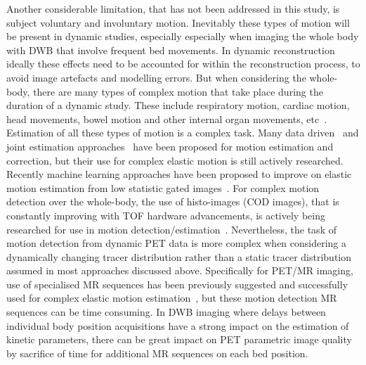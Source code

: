 Another considerable limitation, that has not been addressed in this study, is subject voluntary and involuntary motion. Inevitably these types of motion will be present in dynamic studies, especially especially when imaging the whole body with DWB that involve frequent bed movements. In dynamic reconstruction ideally these effects need to be accounted for within the reconstruction process, to avoid image artefacts and modelling errors.
But when considering the whole-body, there are many types of complex motion that take place during the duration of a dynamic study. These include respiratory motion, cardiac motion, head movements, bowel motion and other internal organ movements, etc~\cite{Gallezot2019}. Estimation of all these types of motion is a complex task. Many data driven~\cite{Schleyer2015,Kesner2019,Lu2020} and joint estimation approaches~\cite{Bousse2017,Jiao2017} have been proposed for motion estimation and correction, but their use for complex elastic motion is still actively researched. Recently machine learning approaches have been proposed to improve on elastic motion estimation from low statistic gated images~\cite{Zhou2020,Zhou2021}. For complex motion detection over the whole-body, the use of histo-images (COD images), that is constantly improving with TOF hardware advancements, is actively being researched for use in motion detection/estimation~\cite{Panin1551}. 
Nevertheless, the task of motion detection from dynamic PET data is more complex when considering a dynamically changing tracer distribution rather than a static tracer distribution assumed in most approaches discussed above.
Specifically for PET/MR imaging, use of specialised MR sequences has been previously suggested and successfully used for complex elastic motion estimation~\cite{Tsoumpas2010,Catana2015}, but these motion detection MR sequences can be time consuming. In DWB imaging where delays between individual body position acquisitions have a strong impact on the estimation of kinetic parameters, there can be great impact on PET parametric image quality by sacrifice of time for additional MR sequences on each bed position. 

